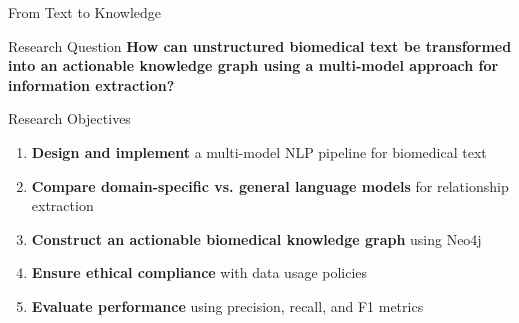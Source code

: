 \documentclass[aspectratio=169, 11pt]{beamer}
\begin{document}
\begin{frame}{From Text to Knowledge}
    \vspace{0.8cm}
    \begin{center}
    \end{center}
    
    \vspace{0.8cm}
    \begin{block}{Research Question}
        \textbf{How can unstructured biomedical text be transformed into an actionable knowledge graph using a multi-model approach for information extraction?}
    \end{block}
\end{frame}

\begin{frame}{Research Objectives}
    \vspace{0.5cm}
    \begin{enumerate}
        \setlength{\itemsep}{0.6cm}
        \item \textbf{Design and implement} a multi-model NLP pipeline for biomedical text
        
        \item \textbf{Compare domain-specific vs. general language models} for relationship extraction
        
        \item \textbf{Construct an actionable biomedical knowledge graph} using Neo4j
        
        \item \textbf{Ensure ethical compliance} with data usage policies
        
        \item \textbf{Evaluate performance} using precision, recall, and F1 metrics
    \end{enumerate}
\end{frame}
\end{document}
